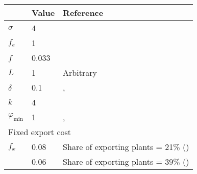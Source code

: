 \begin{tabular}{lll}
& Value & Reference\\
\hline
$\sigma$ & 4 & \cite{Irrazabal_2015}\\
$f_e$ & 1 & \cite{ghironi}\\
$f$ & 0.033 & \cite{ghironi} \\
$L$ & 1 & Arbitrary\\
$\delta$ & 0.1 & \cite{ghironi}, \cite{Irrazabal_2015}\\
$k$ & 4 \\
$\varphi_{\text{min}}$ & 1 & \cite{ghironi}, \cite{Irrazabal_2015}\\ \hline
\multicolumn{3}{l}{Fixed export cost } \\
$f_x $ & 0.08 & Share of exporting plants = 21\% (\cite{ghironi}) \\
& 0.06& Share of exporting plants = 39\% (\cite{Lincoln_McCallum2018}) \\
\hline
\end{tabular} 